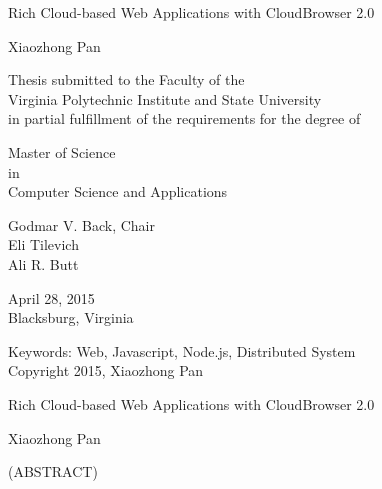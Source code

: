 \documentclass[12pt]{report}
\begin{document}
\newcommand{\cb}{Cloud\-Browser\xspace}
\newcommand{\projectname}{Cloud\-Browser\xspace}
\newcommand{\cbtwo}{Cloud\-Browser 2.0\xspace}
\newcommand{\js}{Java\-Script\xspace}
\newcommand{\nodejs}{Node.js\xspace}
\newcommand{\appins}{App Instance\xspace}
\newcommand{\citemain}{~\cite{mcdaniel2012cloudbrowser}}
\newcommand{\etdtitle}{Rich Cloud-based Web Applications with \cbtwo}

\newcommand{\longcaption}[2]{\caption[#1]{#1 #2}}



\def\code#1{\texttt{#1}}
\def\nodermi{\texttt{nodermi\xspace}}

\thispagestyle{empty}
\begin{center}

{\Large 
\etdtitle{}
}

\vfill

Xiaozhong Pan

\vfill

Thesis submitted to the Faculty of the \\
Virginia Polytechnic Institute and State University \\
in partial fulfillment of the requirements for the degree of

\vfill

Master of Science \\
in \\
Computer Science and Applications

\vfill

Godmar V. Back, Chair \\
Eli Tilevich\\
Ali R. Butt

\vfill

April 28, 2015 \\
Blacksburg, Virginia

\vfill

Keywords: Web, Javascript, Node.js, Distributed System
\\
Copyright 2015, Xiaozhong Pan

\end{center}

\pagebreak

\thispagestyle{empty}
\begin{center}

{\large \etdtitle{}}

\vfill

Xiaozhong Pan

\vfill

(ABSTRACT)

\vfill

\end{center}
\end{document}
